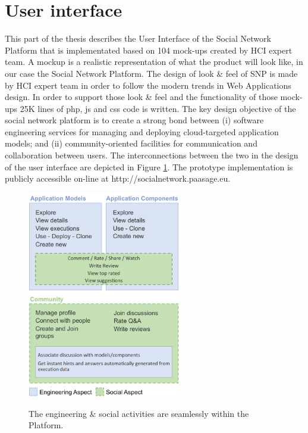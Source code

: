 \section{User interface}
This part of the thesis describes the User Interface of the Social Network Platform that is implementated based on 104 mock-ups created by HCI expert team. A mockup is a realistic representation of what the product will look like, in our case the Social Network Platform. The design of look \& feel of SNP is made by HCI expert team in order to follow the modern trends in Web Applications design. In order to support those look \& feel and the functionality of those mock-ups 25K lines of php, js and css code is written.
The key design objective of the social network platform is to create a strong bond between (i) software engineering services for managing and deploying cloud-targeted application models; and (ii) community-oriented facilities for communication and
collaboration between users. The interconnections between the two in the design of the user interface are depicted in Figure \ref{fig:two_aspects}.
The prototype implementation is publicly accessible on-line at http://socialnetwork.paasage.eu. 

\begin{figure}[h]
	\caption{The engineering \& social activities are seamlessly within the Platform.}
	\includegraphics[width=0.6\textwidth,natwidth=200,natheight=150]{./fig/two_aspectes.png}
	\centering
	\label{fig:two_aspects}
\end{figure}

